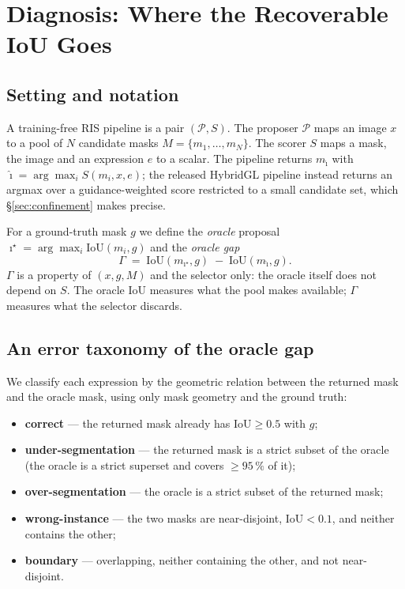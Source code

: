 \section{Diagnosis: Where the Recoverable IoU Goes}
\label{sec:diagnosis}

\subsection{Setting and notation}

A training-free RIS pipeline is a pair $(\mathcal{P}, S)$. The proposer
$\mathcal{P}$ maps an image $x$ to a pool of $N$ candidate masks
$M=\{m_1,\dots,m_N\}$. The scorer $S$ maps a mask, the image and an expression
$e$ to a scalar. The pipeline returns $m_{\hat\imath}$ with
$\hat\imath = \arg\max_i S(m_i, x, e)$; the released HybridGL pipeline instead
returns an argmax over a guidance-weighted score restricted to a small
candidate set, which §\ref{sec:confinement} makes precise.

For a ground-truth mask $g$ we define the \emph{oracle} proposal
$\imath^\star = \arg\max_i \mathrm{IoU}(m_i, g)$ and the \emph{oracle gap}
\[
  \Gamma \;=\; \mathrm{IoU}(m_{\imath^\star}, g) \;-\; \mathrm{IoU}(m_{\hat\imath}, g).
\]
$\Gamma$ is a property of $(x, g, M)$ and the selector only: the oracle itself
does not depend on $S$. The oracle IoU measures what the pool makes available;
$\Gamma$ measures what the selector discards.

\subsection{An error taxonomy of the oracle gap}

We classify each expression by the geometric relation between the returned
mask and the oracle mask, using only mask geometry and the ground truth:

\begin{itemize}
\item \textbf{correct} --- the returned mask already has $\mathrm{IoU} \ge 0.5$
with $g$;
\item \textbf{under-segmentation} --- the returned mask is a strict subset of
the oracle (the oracle is a strict superset and covers $\ge 95\,\%$ of it);
\item \textbf{over-segmentation} --- the oracle is a strict subset of the
returned mask;
\item \textbf{wrong-instance} --- the two masks are near-disjoint,
$\mathrm{IoU} < 0.1$, and neither contains the other;
\item \textbf{boundary} --- overlapping, neither containing the other, and not
near-disjoint.
\end{itemize}

